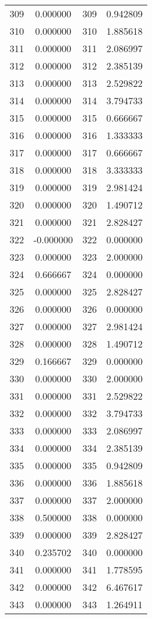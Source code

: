 \documentclass[12pt]{article}
\begin{document}
\begin{longtable}{@{}cccc@{}}
309 & 0.000000 & 309 & 0.942809 \\
310 & 0.000000 & 310 & 1.885618 \\
311 & 0.000000 & 311 & 2.086997 \\
312 & 0.000000 & 312 & 2.385139 \\
313 & 0.000000 & 313 & 2.529822 \\
314 & 0.000000 & 314 & 3.794733 \\
315 & 0.000000 & 315 & 0.666667 \\
316 & 0.000000 & 316 & 1.333333 \\
317 & 0.000000 & 317 & 0.666667 \\
318 & 0.000000 & 318 & 3.333333 \\
319 & 0.000000 & 319 & 2.981424 \\
320 & 0.000000 & 320 & 1.490712 \\
321 & 0.000000 & 321 & 2.828427 \\
322 & -0.000000 & 322 & 0.000000 \\
323 & 0.000000 & 323 & 2.000000 \\
324 & 0.666667 & 324 & 0.000000 \\
325 & 0.000000 & 325 & 2.828427 \\
326 & 0.000000 & 326 & 0.000000 \\
327 & 0.000000 & 327 & 2.981424 \\
328 & 0.000000 & 328 & 1.490712 \\
329 & 0.166667 & 329 & 0.000000 \\
330 & 0.000000 & 330 & 2.000000 \\
331 & 0.000000 & 331 & 2.529822 \\
332 & 0.000000 & 332 & 3.794733 \\
333 & 0.000000 & 333 & 2.086997 \\
334 & 0.000000 & 334 & 2.385139 \\
335 & 0.000000 & 335 & 0.942809 \\
336 & 0.000000 & 336 & 1.885618 \\
337 & 0.000000 & 337 & 2.000000 \\
338 & 0.500000 & 338 & 0.000000 \\
339 & 0.000000 & 339 & 2.828427 \\
340 & 0.235702 & 340 & 0.000000 \\
341 & 0.000000 & 341 & 1.778595 \\
342 & 0.000000 & 342 & 6.467617 \\
343 & 0.000000 & 343 & 1.264911 \\

\end{longtable}
\end{document}
